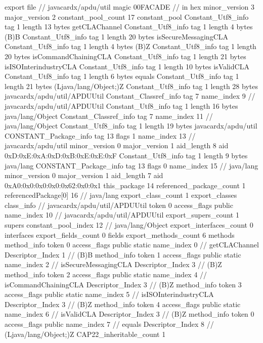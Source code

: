 export file {		// javacardx/apdu/util
	magic	00FACADE		 // in hex
	minor_version	3
	major_version	2
	constant_pool_count	17
	constant_pool {
		Constant_Utf8_info {
			tag	1
			length	13
			bytes	getCLAChannel
		}
		Constant_Utf8_info {
			tag	1
			length	4
			bytes	(B)B
		}
		Constant_Utf8_info {
			tag	1
			length	20
			bytes	isSecureMessagingCLA
		}
		Constant_Utf8_info {
			tag	1
			length	4
			bytes	(B)Z
		}
		Constant_Utf8_info {
			tag	1
			length	20
			bytes	isCommandChainingCLA
		}
		Constant_Utf8_info {
			tag	1
			length	21
			bytes	isISOInterindustryCLA
		}
		Constant_Utf8_info {
			tag	1
			length	10
			bytes	isValidCLA
		}
		Constant_Utf8_info {
			tag	1
			length	6
			bytes	equals
		}
		Constant_Utf8_info {
			tag	1
			length	21
			bytes	(Ljava/lang/Object;)Z
		}
		Constant_Utf8_info {
			tag	1
			length	28
			bytes	javacardx/apdu/util/APDUUtil
		}
		Constant_Classref_info {
			tag	7
			name_index	9		// javacardx/apdu/util/APDUUtil
		}
		Constant_Utf8_info {
			tag	1
			length	16
			bytes	java/lang/Object
		}
		Constant_Classref_info {
			tag	7
			name_index	11		// java/lang/Object
		}
		Constant_Utf8_info {
			tag	1
			length	19
			bytes	javacardx/apdu/util
		}
		CONSTANT_Package_info {
			tag	13
			flags	1
			name_index	13		// javacardx/apdu/util
			minor_version	0
			major_version	1
			aid_length	8
			aid	0xD:0xE:0xA:0xD:0xB:0xE:0xE:0xF
		}
		Constant_Utf8_info {
			tag	1
			length	9
			bytes	java/lang
		}
		CONSTANT_Package_info {
			tag	13
			flags	0
			name_index	15		// java/lang
			minor_version	0
			major_version	1
			aid_length	7
			aid	0xA0:0x0:0x0:0x0:0x62:0x0:0x1
		}
	}
	this_package	14
	referenced_package_count	1
	referencedPackage[0]	16		// java/lang
	export_class_count	1
	export_classes {
		class_info {		// javacardx/apdu/util/APDUUtil
			token	0
			access_flags	public
			name_index	10		// javacardx/apdu/util/APDUUtil
			export_supers_count	1
			supers {
				constant_pool_index	12		// java/lang/Object
			}
			export_interfaces_count	0
			interfaces {
			}
			export_fields_count	0
			fields {
			}
			export_methods_count	6
			methods {
				method_info {
					token	0
					access_flags	public static
					name_index	0		// getCLAChannel
					Descriptor_Index	1		// (B)B
				}
				method_info {
					token	1
					access_flags	public static
					name_index	2		// isSecureMessagingCLA
					Descriptor_Index	3		// (B)Z
				}
				method_info {
					token	2
					access_flags	public static
					name_index	4		// isCommandChainingCLA
					Descriptor_Index	3		// (B)Z
				}
				method_info {
					token	3
					access_flags	public static
					name_index	5		// isISOInterindustryCLA
					Descriptor_Index	3		// (B)Z
				}
				method_info {
					token	4
					access_flags	public static
					name_index	6		// isValidCLA
					Descriptor_Index	3		// (B)Z
				}
				method_info {
					token	0
					access_flags	public
					name_index	7		// equals
					Descriptor_Index	8		// (Ljava/lang/Object;)Z
				}
			}
			CAP22_inheritable_count	1
		}
	}
}
